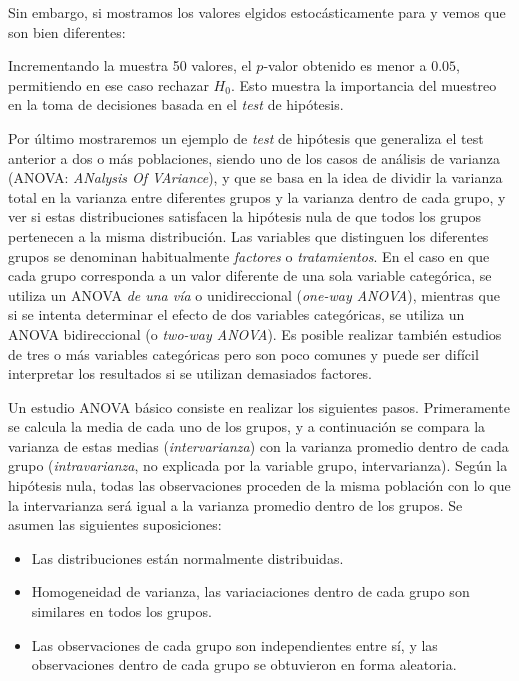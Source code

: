 
Sin embargo, si mostramos los valores elgidos estocásticamente para  y  vemos que son bien diferentes:


Incrementando la muestra 50 valores, el $p$-valor obtenido es menor a $0.05$, permitiendo en ese caso rechazar $H_0$. Esto muestra la importancia del muestreo en la toma de decisiones basada en el \textit{test} de hipótesis.


Por último mostraremos un ejemplo de \textit{test} de hipótesis que generaliza el test anterior a dos o más poblaciones, siendo uno de los casos de análisis de varianza (ANOVA: \textit{ANalysis Of VAriance}), y que se basa en la idea de dividir la varianza total en la varianza entre diferentes grupos y la varianza dentro de cada grupo, y ver si estas distribuciones satisfacen la hipótesis nula de que todos los grupos pertenecen a la misma distribución. Las variables que distinguen los diferentes grupos se denominan habitualmente \textit{factores} o \textit{tratamientos}. En el caso en que cada grupo corresponda a un valor diferente de una sola variable categórica, se utiliza un ANOVA \textit{de una vía} o unidireccional (\textit{one-way ANOVA}), mientras que si se intenta determinar el efecto de dos variables categóricas, se utiliza un ANOVA bidireccional (o \textit{two-way ANOVA}). Es posible realizar también estudios de tres o más variables categóricas pero son poco comunes y puede ser difícil interpretar los resultados si se utilizan demasiados factores.

Un estudio ANOVA básico consiste en realizar los siguientes pasos. Primeramente se calcula la media de cada uno de los grupos, y a continuación se compara la varianza de estas medias (\textit{intervarianza}) con la varianza promedio dentro de cada grupo (\textit{intravarianza}, no explicada por la variable grupo, intervarianza). Según la hipótesis nula, todas las observaciones proceden de la misma población con lo que la intervarianza será igual a la varianza promedio dentro de los grupos. Se asumen las siguientes suposiciones:
\begin{itemize}
 \item Las distribuciones están normalmente distribuidas.
 \item Homogeneidad de varianza, las variaciaciones dentro de cada grupo son similares en todos los grupos.
 \item Las observaciones de cada grupo son independientes entre sí, y las observaciones dentro de cada grupo se obtuvieron en forma aleatoria.
\end{itemize}

